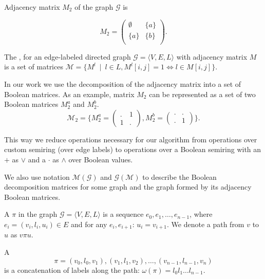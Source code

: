 Adjacency matrix $M_2$ of the graph $\mathcal{G}$ is 

$$
    M_2 =
    \begin{pmatrix}
    \emptyset & \{a\}     \\
   \{a\}   &   \{b\}     \\
    \end{pmatrix}.
$$

\begin{definition}
The , 
for an edge-labeled directed graph $\mathcal{G} = 
\langle V,E,L \rangle$ with adjacency matrix $M$ is a set of matrices $\mathcal{M} = \{ M^l~\mid~l \in L,M^l[i,j] = 1 \iff l \in M[i,j]\}$.
\end{definition}

In our work we use the decomposition of the adjacency matrix into a set of Boolean matrices. As an example, matrix $M_2$ can be represented as a set of two Boolean matrices $M_2^a$ and $M_2^b$.
$$
\mathcal{M}_2 =\bigg\{
M_2^{a} =
\begin{pmatrix}
    . & 1     \\
    1 & .   
\end{pmatrix}, 
M_2^{b} =
\begin{pmatrix}      
    . & .    \\
    . & 1
\end{pmatrix}
\bigg\}.
$$

This way we reduce operations necessary for our algorithm from
operations over custom semiring (over edge labels) to operations over a Boolean semiring with an  $+$ as $\lor$ and a  $\cdot$ as $\land$ over Boolean values.

We also use notation $\mathcal{M}(\mathcal{G})$ and $\mathcal{G}(\mathcal{M})$ to describe the Boolean decomposition matrices for some graph and the graph formed by its adjacency Boolean matrices.

\begin{definition}
A  $\pi$ in the graph $\mathcal{G} = \langle V,E,L \rangle$ is a sequence $e_0,e_1,\ldots,e_{n-1}$, where $e_i = (v_i,l_i,u_i) \in E$ and for any $e_i, e_{i+1}$: $u_i = v_{i+1}$. We denote a path from $v$ to $u$ as $v\pi u$.
\end{definition}

\begin{definition}
A  $$\pi = (v_0,l_0,v_1),(v_1,l_1,v_2),\ldots,(v_{n-1},l_{n-1},v_n)$$ is a concatenation of labels along the path: $\omega(\pi) = l_0 l_1 \ldots l_{n-1}$.
\end{definition}


